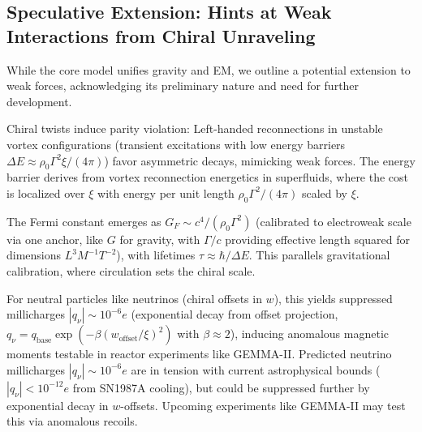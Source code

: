 \medskip
\noindent
{}
\medskip

\subsection{Speculative Extension: Hints at Weak Interactions from Chiral Unraveling}

While the core model unifies gravity and EM, we outline a potential extension to weak forces, acknowledging its preliminary nature and need for further development.

Chiral twists induce parity violation: Left-handed reconnections in unstable vortex configurations (transient excitations with low energy barriers $\Delta E \approx \rho_0 \Gamma^2 \xi /(4\pi)$) favor asymmetric decays, mimicking weak forces. The energy barrier derives from vortex reconnection energetics in superfluids, where the cost is localized over $\xi$ with energy per unit length $\rho_0 \Gamma^2 /(4\pi)$ scaled by $\xi$.

The Fermi constant emerges as $G_F \sim c^4 / (\rho_0 \Gamma^2)$ (calibrated to electroweak scale via one anchor, like $G$ for gravity, with $\Gamma / c$ providing effective length squared for dimensions $L^3 M^{-1} T^{-2}$), with lifetimes $\tau \approx \hbar / \Delta E$. This parallels gravitational calibration, where circulation sets the chiral scale.

For neutral particles like neutrinos (chiral offsets in $w$), this yields suppressed millicharges $|q_\nu| \sim 10^{-6} e$ (exponential decay from offset projection, $q_\nu = q_{\text{base}} \exp(- \beta (w_{\text{offset}} / \xi)^2)$ with $\beta \approx 2$), inducing anomalous magnetic moments testable in reactor experiments like GEMMA-II. Predicted neutrino millicharges $|q_\nu| \sim 10^{-6} e$ are in tension with current astrophysical bounds ($|q_\nu| < 10^{-12} e$ from SN1987A cooling), but could be suppressed further by exponential decay in $w$-offsets. Upcoming experiments like GEMMA-II may test this via anomalous recoils.

